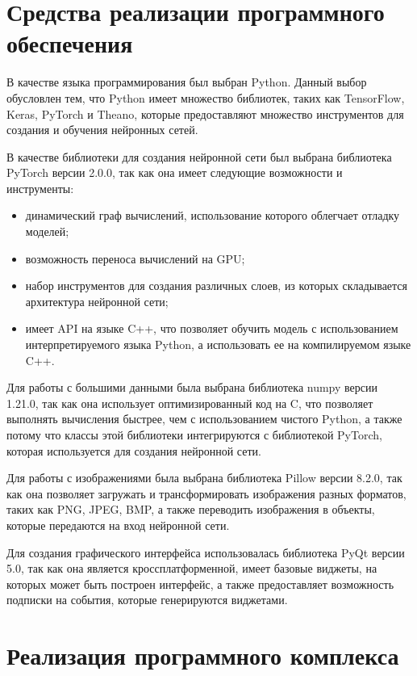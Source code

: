 \section{Средства реализации программного обеспечения}

В качестве языка программирования был выбран Python. Данный выбор обусловлен тем, что Python имеет множество библиотек, таких как TensorFlow, Keras, PyTorch и Theano, которые предоставляют множество инструментов для создания и обучения нейронных сетей.

В качестве библиотеки для создания нейронной сети был выбрана библиотека PyTorch версии 2.0.0, так как она имеет следующие возможности и инструменты:
\begin{itemize}
	\item динамический граф вычислений, использование которого облегчает отладку моделей;
	\item возможность переноса вычислений на GPU;
	\item набор инструментов для создания различных слоев, из которых складывается архитектура нейронной сети;
	\item имеет API на языке C++, что позволяет обучить модель с использованием интерпретируемого языка Python, а использовать ее на компилируемом языке C++.
\end{itemize}

Для работы с большими данными была выбрана библиотека numpy версии 1.21.0, так как она использует оптимизированный код на C, что позволяет выполнять вычисления быстрее, чем с использованием чистого Python, а также потому что классы этой библиотеки интегрируются с библиотекой PyTorch, которая используется для создания нейронной сети.

Для работы с изображениями была выбрана библиотека Pillow версии 8.2.0, так как она позволяет загружать и трансформировать изображения разных форматов, таких как PNG, JPEG, BMP, а также переводить изображения в объекты, которые передаются на вход нейронной сети.

Для создания графического интерфейса использовалась библиотека PyQt версии 5.0, так как она является кроссплатформенной, имеет базовые виджеты, на которых может быть построен интерфейс, а также предоставляет возможность подписки на события, которые генерируются виджетами.

\section{Реализация программного комплекса}

